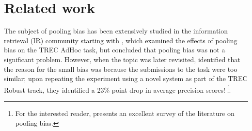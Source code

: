 \section{Related work}
\label{sec:related}

The subject of pooling bias has been extensively studied in the information retrieval (IR) community starting with \citet{zobel1998reliable}, which examined the effects of pooling bias on the TREC AdHoc task, but concluded that pooling bias was not a significant problem. %
However, when the topic was later revisited,
\citet{buckley2007bias} identified that the reason for the small bias was because the submissions to the task were too similar; upon repeating the experiment using a novel system as part of the TREC Robust track, they identified a 23\% point drop in average precision scores!%
\footnote{For the interested reader, \citet{webber2010measurement} presents an excellent survey of the literature on pooling bias.}

